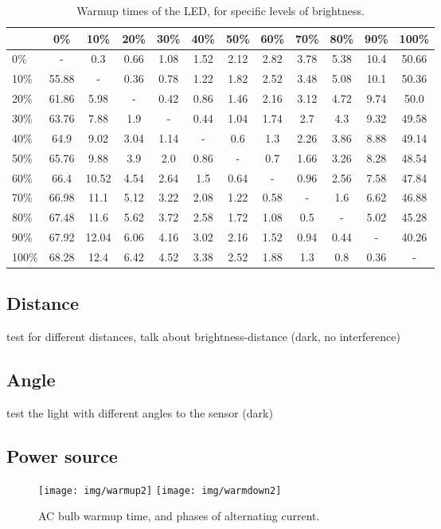 \begin{table}[hbt]
\centering
  \begin{tabular}{ l | c c c c c c c c c c c}
    & 0\% & 10\% & 20\% & 30\% & 40\% & 50\% & 60\% & 70\% & 80\% & 90\% & 100\% \\
    \hline
0\% & - & 0.3 & 0.66 & 1.08 & 1.52 & 2.12 & 2.82 & 3.78 & 5.38 & 10.4 & 50.66 \\
10\% & 55.88 & - & 0.36 & 0.78 & 1.22 & 1.82 & 2.52 & 3.48 & 5.08 & 10.1 & 50.36 \\
20\% & 61.86 & 5.98 & - & 0.42 & 0.86 & 1.46 & 2.16 & 3.12 & 4.72 & 9.74 & 50.0 \\
30\% & 63.76 & 7.88 & 1.9 & - & 0.44 & 1.04 & 1.74 & 2.7 & 4.3 & 9.32 & 49.58 \\
40\% & 64.9 & 9.02 & 3.04 & 1.14 & - & 0.6 & 1.3 & 2.26 & 3.86 & 8.88 & 49.14 \\
50\% & 65.76 & 9.88 & 3.9 & 2.0 & 0.86 & - & 0.7 & 1.66 & 3.26 & 8.28 & 48.54 \\
60\% & 66.4 & 10.52 & 4.54 & 2.64 & 1.5 & 0.64 & - & 0.96 & 2.56 & 7.58 & 47.84 \\
70\% & 66.98 & 11.1 & 5.12 & 3.22 & 2.08 & 1.22 & 0.58 & - & 1.6 & 6.62 & 46.88 \\
80\% & 67.48 & 11.6 & 5.62 & 3.72 & 2.58 & 1.72 & 1.08 & 0.5 & - & 5.02 & 45.28 \\
90\% & 67.92 & 12.04 & 6.06 & 4.16 & 3.02 & 2.16 & 1.52 & 0.94 & 0.44 & - & 40.26 \\
100\% & 68.28 & 12.4 & 6.42 & 4.52 & 3.38 & 2.52 & 1.88 & 1.3 & 0.8 & 0.36 & - \\
  \end{tabular}
  \caption{Warmup times of the LED, for specific levels of brightness.}
  \label{tab:warmup}
\end{table}


\subsection{Distance}
test for different distances, talk about brightness-distance (dark, no interference)

\subsection{Angle}
test the light with different angles to the sensor (dark)

\subsection{Power source}
\begin{figure}[h]
\centering
\texttt{[image: img/warmup2]}
\texttt{[image: img/warmdown2]}
\caption{AC bulb warmup time, and phases of alternating current.}
\label{fig:warmupAC}
\end{figure}
